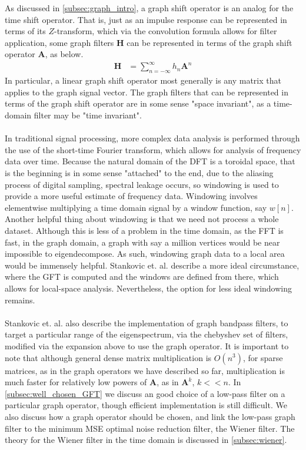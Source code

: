 \documentclass[12pt,a4paper]{article} %
\begin{document}
As discussed in \ref{subsec:graph_intro}, a graph shift operator is an analog for the time shift operator. That is, just as an impulse response can be represented in terms of its $Z$-transform, which via the convolution formula allows for filter application, some graph filters $\pmb{H}$ can be represented in terms of the graph shift operator $\pmb{A}$, as below.
\begin{align*}
    \pmb{H}&=\sum_{n=-\infty}^\infty h_n\pmb{A}^n
\end{align*}
In particular, a linear graph shift operator most generally is any matrix that applies to the graph signal vector. The graph filters that can be represented in terms of the graph shift operator are in some sense "space invariant", as a time-domain filter may be "time invariant".\\\\
In traditional signal processing, more complex data analysis is performed through the use of the short-time Fourier transform, which allows for analysis of frequency data over time. Because the natural domain of the DFT is a toroidal space, that is the beginning is in some sense "attached" to the end, due to the aliasing process of digital sampling, spectral leakage occurs, so windowing is used to provide a more useful estimate of frequency data. Windowing involves elementwise multiplying a time domain signal by a window function, say $w[n]$. Another helpful thing about windowing is that we need not process a whole dataset. Although this is less of a problem in the time domain, as the FFT is fast, in the graph domain, a graph with say a million vertices would be near impossible to eigendecompose. As such, windowing graph data to a local area would be immensely helpful. Stankovic et. al. describe a more ideal circumstance, where the GFT is computed and the windows are defined from there, which allows for local-space analysis. Nevertheless, the option for less ideal windowing remains.\\\\
Stankovic et. al. also describe the implementation of graph bandpass filters, to target a particular range of the eigenspectrum, via the chebyshev set of filters, modified via the expansion above to use the graph operator. It is important to note that although general dense matrix multiplication is $O(n^3)$, for sparse matrices, as in the graph operators we have described so far, multiplication is much faster for relatively low powers of $\pmb{A}$, as in $\pmb{A}^k$, $k<<n$. In \ref{subsec:well_chosen_GFT} we discuss an good choice of a low-pass filter on a particular graph operator, though efficient implementation is still difficult. We also discuss how a graph operator should be chosen, and link the low-pass graph filter to the minimum MSE optimal noise reduction filter, the Wiener filter. The theory for the Wiener filter in the time domain is discussed in \ref{subsec:wiener}.
\end{document}
